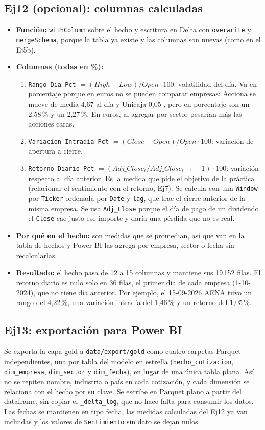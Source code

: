 \documentclass[11pt,a4paper]{article}
\newcommand{\code}[1]{\texttt{#1}}
\begin{document}
\subsection*{Ej12 (opcional): columnas calculadas}
\begin{itemize}
    \item \textbf{Función:} \code{withColumn} sobre el hecho y escritura en Delta con \code{overwrite} y \code{mergeSchema}, porque la tabla ya existe y las columnas son nuevas (como en el Ej5b).
    \item \textbf{Columnas (todas en \%):}
    \begin{enumerate}
        \item \code{Rango\_Dia\_Pct} $= (High - Low)/Open \cdot 100$: volatilidad del día. Va en porcentaje porque en euros no se pueden comparar empresas: Acciona se mueve de media 4,67 \texteuro{} al día y Unicaja 0,05 \texteuro{}, pero en porcentaje son un 2,58\,\% y un 2,27\,\%. En euros, al agregar por sector pesarían más las acciones caras.
        \item \code{Variacion\_Intradia\_Pct} $= (Close - Open)/Open \cdot 100$: variación de apertura a cierre.
        \item \code{Retorno\_Diario\_Pct} $= (Adj\_Close_t / Adj\_Close_{t-1} - 1) \cdot 100$: variación respecto al día anterior. Es la medida que pide el objetivo de la práctica (relacionar el sentimiento con el retorno, Ej7). Se calcula con una \code{Window} por \code{Ticker} ordenada por \code{Date} y \code{lag}, que trae el cierre anterior de la misma empresa. Se usa \code{Adj\_Close} porque el día de pago de un dividendo el \code{Close} cae justo ese importe y daría una pérdida que no es real.
    \end{enumerate}
    \item \textbf{Por qué en el hecho:} son medidas que se promedian, así que van en la tabla de hechos y Power BI las agrega por empresa, sector o fecha sin recalcularlas.
    \item \textbf{Resultado:} el hecho pasa de 12 a 15 columnas y mantiene sus 19\,152 filas. El retorno diario es nulo solo en 36 filas, el primer día de cada empresa (1-10-2024), que no tiene día anterior. Por ejemplo, el 15-09-2026 AENA tuvo un rango del 4,22\,\%, una variación intradía del 1,46\,\% y un retorno del 1,05\,\%.
\end{itemize}

\subsection*{Ej13: exportación para Power BI}
Se exporta la capa gold a \code{data/export/gold} como cuatro carpetas Parquet independientes, una por tabla del modelo en estrella (\code{hecho\_cotizacion}, \code{dim\_empresa}, \code{dim\_sector} y \code{dim\_fecha}), en lugar de una única tabla plana. Así no se repiten nombre, industria o país en cada cotización, y cada dimensión se relaciona con el hecho por su clave. Se escribe en Parquet plano a partir del dataframe, sin copiar el \code{\_delta\_log}, que no hace falta para consumir los datos. Las fechas se mantienen en tipo fecha, las medidas calculadas del Ej12 ya van incluidas y los valores de \code{Sentimiento} sin dato se dejan nulos.
\end{document}
